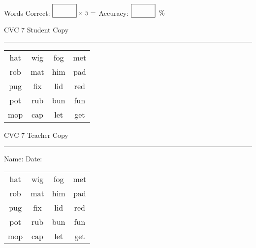 \documentclass{memoir}
\begin{document}
\normalsize

Words Correct: $\fbox{\phantom{\huge 100}} \times 5 = $ Accuracy: $\fbox{\phantom{\huge 100}}\;\; \%$ 

\vfill

\newpage


\footnotesize \noindent
CVC 7 \hfill Student Copy
\smallskip
\hrule

\huge

\setlength{\tabcolsep}{14pt}
\def\arraystretch{2}

{\selectfont


\begin{vplace}[0.5]
\begin{center}
\begin{tabular}{cccc}
hat & wig & fog & met \\
rob & mat & him & pad \\
pug & fix & lid & red \\
pot & rub & bun & fun \\
mop & cap & let & get \\
\end{tabular}
\end{center}
\end{vplace}

}

\newpage

\footnotesize \noindent
CVC 7 \hfill Teacher Copy
\smallskip
\hrule

\normalsize

\vfill

\noindent
Name: \underline{\hspace{1.75in}} \hfill Date: \underline{\hspace{1in}}

\huge

{\selectfont


\begin{vplace}[0.5]
\begin{center}
\begin{tabular}{cccc}
hat & wig & fog & met \\
rob & mat & him & pad \\
pug & fix & lid & red \\
pot & rub & bun & fun \\
mop & cap & let & get \\
\end{tabular}
\end{center}
\end{vplace}



}
\end{document}
